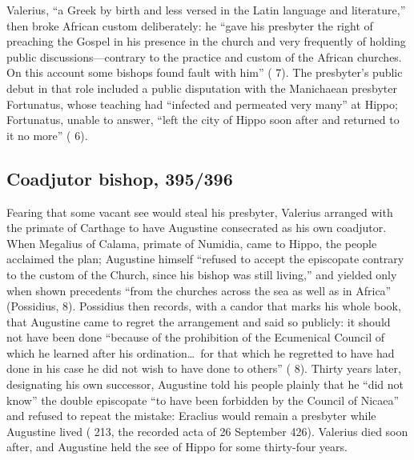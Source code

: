Valerius, ``a Greek by birth and less versed in the Latin language and
literature,'' then broke African custom deliberately: he ``gave his
presbyter the right of preaching the Gospel in his presence in the church
and very frequently of holding public discussions---contrary to the practice
and custom of the African churches. On this account some bishops found fault
with him'' ( 7). The presbyter's public debut in that role
included a public disputation with the Manichaean presbyter Fortunatus,
whose teaching had ``infected and permeated very many'' at Hippo;
Fortunatus, unable to answer, ``left the city of Hippo soon after and
returned to it no more'' ( 6).

\subsection{Coadjutor bishop, 395/396}

Fearing that some vacant see would steal his presbyter, Valerius arranged
with the primate of Carthage to have Augustine consecrated as his own
coadjutor. When Megalius of Calama, primate of Numidia, came to Hippo,
the people acclaimed the plan; Augustine himself ``refused to accept the
episcopate contrary to the custom of the Church, since his bishop was still
living,'' and yielded only when shown precedents ``from the churches across
the sea as well as in Africa'' (Possidius,  8). Possidius then
records, with a candor that marks his whole book, that Augustine came to
regret the arrangement and said so publicly: it should not have been done
``because of the prohibition of the Ecumenical Council of which he learned
after his ordination\ldots\ for that which he regretted to have had done in
his case he did not wish to have done to others'' ( 8). Thirty
years later, designating his own successor, Augustine told his people
plainly that he ``did not know'' the double episcopate ``to have been
forbidden by the Council of Nicaea'' and refused to repeat the mistake:
Eraclius would remain a presbyter while Augustine lived ( 213,
the recorded acta of 26 September 426). Valerius died soon
after, and Augustine held the see of Hippo for some thirty-four years.


